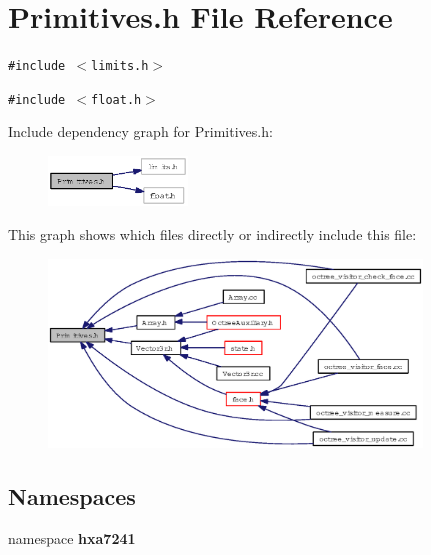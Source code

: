 \section{Primitives.h File Reference}
\label{Primitives_8h}
{\tt \#include $<$limits.h$>$}\par
{\tt \#include $<$float.h$>$}\par


Include dependency graph for Primitives.h:\begin{figure}[H]
\begin{center}
\leavevmode
\includegraphics[width=105pt]{Primitives_8h__incl}
\end{center}
\end{figure}


This graph shows which files directly or indirectly include this file:\begin{figure}[H]
\begin{center}
\leavevmode
\includegraphics[width=281pt]{Primitives_8h__dep__incl}
\end{center}
\end{figure}
\subsection*{Namespaces}
\begin{CompactItemize}
\item 
namespace {\bf hxa7241}
\end{CompactItemize}
